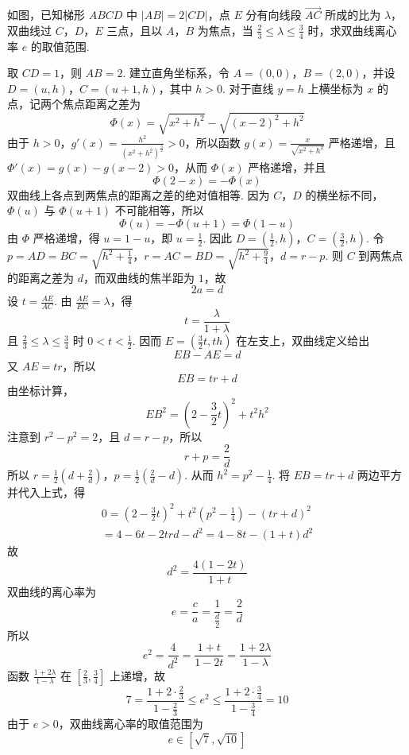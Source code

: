 \begin{problem}
如图，已知梯形 \(ABCD\) 中 \(|AB| = 2|CD|\)，点 \(E\) 分有向线段 \(\overrightarrow{AC}\) 所成的比为 \(\lambda\)，双曲线过 \(C\)，\(D\)，\(E\) 三点，且以 \(A\)，\(B\) 为焦点，当 \(\frac{2}{3} \leqslant \lambda \leqslant \frac{3}{4}\) 时，求双曲线离心率 \(e\) 的取值范围.

\end{problem}

\begin{solution}
取 \(CD=1\)，则 \(AB=2\). 建立直角坐标系，令 \(A=(0,0)\)，\(B=(2,0)\)，并设 \(D=(u,h)\)，\(C=(u+1,h)\)，其中 \(h>0\). 对于直线 \(y=h\) 上横坐标为 \(x\) 的点，记两个焦点距离之差为
\[
\Phi(x)=\sqrt{x^{2}+h^{2}}-\sqrt{(x-2)^{2}+h^{2}}
\]
由于 \(h>0\)，\(g'(x)=\frac{h^{2}}{(x^{2}+h^{2})^{\frac{3}{2}}}>0\)，所以函数 \(g(x)=\frac{x}{\sqrt{x^{2}+h^{2}}}\) 严格递增，且 \(\Phi'(x)=g(x)-g(x-2)>0\)，从而 \(\Phi(x)\) 严格递增，并且
\[
\Phi(2-x)=-\Phi(x)
\]
双曲线上各点到两焦点的距离之差的绝对值相等. 因为 \(C\)，\(D\) 的横坐标不同，\(\Phi(u)\) 与 \(\Phi(u+1)\) 不可能相等，所以
\[
\Phi(u)=-\Phi(u+1)=\Phi(1-u)
\]
由 \(\Phi\) 严格递增，得 \(u=1-u\)，即 \(u=\frac{1}{2}\). 因此 \(D=\left(\frac{1}{2},h\right)\)，\(C=\left(\frac{3}{2},h\right)\).
令 \(p=AD=BC=\sqrt{h^{2}+\frac{1}{4}}\)，\(r=AC=BD=\sqrt{h^{2}+\frac{9}{4}}\)，\(d=r-p\).
则 \(C\) 到两焦点的距离之差为 \(d\)，而双曲线的焦半距为 \(1\)，故
\[
2a=d
\]
设 \(t=\frac{AE}{AC}\). 由 \(\frac{AE}{EC}=\lambda\)，得
\[
t=\frac{\lambda}{1+\lambda}
\]
且 \(\frac{2}{3}\leqslant\lambda\leqslant\frac{3}{4}\) 时 \(0<t<\frac{1}{2}\). 因而 \(E=\left(\frac{3}{2}t,th\right)\) 在左支上，双曲线定义给出
\[
EB-AE=d
\]
又 \(AE=tr\)，所以
\[
EB=tr+d
\]
由坐标计算，
\[
EB^{2}=\left(2-\frac{3}{2}t\right)^{2}+t^{2}h^{2}
\]
注意到 \(r^{2}-p^{2}=2\)，且 \(d=r-p\)，所以
\[
r+p=\frac{2}{d}
\]
所以 \(r=\frac{1}{2}\left(d+\frac{2}{d}\right)\)，\(p=\frac{1}{2}\left(\frac{2}{d}-d\right)\).
从而 \(h^{2}=p^{2}-\frac{1}{4}\). 将 \(EB=tr+d\) 两边平方并代入上式，得
\[
\begin{gathered}
0=\left(2-\frac{3}{2}t\right)^{2}+t^{2}\left(p^{2}-\frac{1}{4}\right)-(tr+d)^{2}\\
{}=4-6t-2trd-d^{2}=4-8t-(1+t)d^{2}
\end{gathered}
\]
故
\[
d^{2}=\frac{4(1-2t)}{1+t}
\]
双曲线的离心率为
\[
e=\frac{c}{a}=\frac{1}{\frac{d}{2}}=\frac{2}{d}
\]
所以
\[
e^{2}=\frac{4}{d^{2}}=\frac{1+t}{1-2t}=\frac{1+2\lambda}{1-\lambda}
\]
函数 \(\frac{1+2\lambda}{1-\lambda}\) 在 \(\left[\frac{2}{3},\frac{3}{4}\right]\) 上递增，故
\[
7=\frac{1+2\cdot\frac{2}{3}}{1-\frac{2}{3}}\leqslant e^{2}\leqslant\frac{1+2\cdot\frac{3}{4}}{1-\frac{3}{4}}=10
\]
由于 \(e>0\)，双曲线离心率的取值范围为
\[
e\in[\sqrt{7},\sqrt{10}]
\]
\end{solution}
